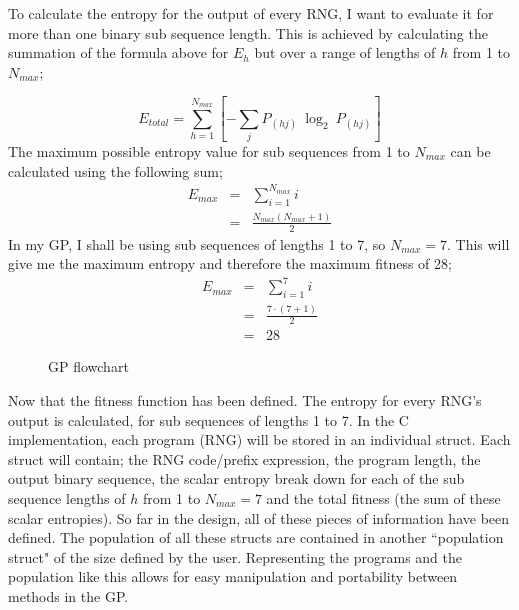 \documentclass[a4paper,10.5pt]{article}
\begin{document}
To calculate the entropy for the output of every RNG, I want to evaluate it for more than one binary sub sequence length. This is achieved by calculating the summation of the formula above for $E_h$ but over a range of lengths of $h$ from 1 to $N_{max}$; 

\begin{equation*}
E_{total} = \sum_{h = 1}^{N_{max}} \left[ - \sum_{j} P_{(hj)}\ \log_2\ P_{(hj)} \right]
\end{equation*}
The maximum possible entropy value for sub sequences from 1 to $N_{max}$ can be calculated using the following sum;
\begin{eqnarray*}
E_{max} &=& \sum_{i = 1}^{N_{max}} i
\\ &=& \frac{N_{max}(N_{max} + 1)}{2}
\end{eqnarray*}
In my GP, I shall be using sub sequences of lengths 1 to 7, so $N_{max} = 7$. This will give me the maximum entropy and therefore the maximum fitness of 28;
\begin{eqnarray*}
E_{max} &=& \sum_{i = 1}^{7} i
\\ &=& \frac{7 \cdot (7 + 1)}{2}
\\ &=& 28
\end{eqnarray*}

\newpage
\begin{wrapfigure}{r}{.3\textwidth}
\caption{GP flowchart}
\label{simpleflow}
\end{wrapfigure}
Now that the fitness function has been defined. The entropy for every RNG's output is calculated, for sub sequences of lengths 1 to 7.
In the C implementation, each program (RNG) will be stored in an individual struct. Each struct will contain; the RNG code/prefix expression, the program length, the output binary sequence, the scalar entropy break down for each of the sub sequence lengths of $h$ from 1 to $N_{max} = 7$ and the total fitness (the sum of these scalar entropies). So far in the design, all of these pieces of information have been defined. The population of all these structs are contained in another ``population struct" of the size defined by the user. Representing the programs and the population like this allows for easy manipulation and portability between methods in the GP.
\end{document}

